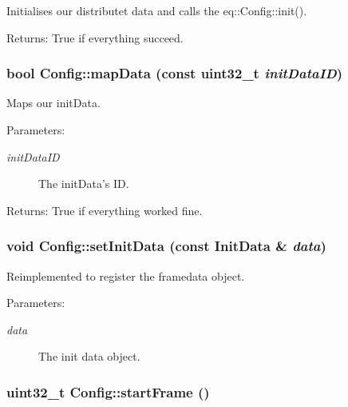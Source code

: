Initialises our distributet data and calls the eq::Config::init(). 

\begin{Desc}
\item[Returns:]True if everything succeed. \end{Desc}
\hypertarget{a00003_140db32dd04daba4cb95233e180b0327}{
\subsubsection[{mapData}]{\setlength{\rightskip}{0pt plus 5cm}bool Config::mapData (const uint32\_\-t {\em initDataID})}}
\label{a00003_140db32dd04daba4cb95233e180b0327}


Maps our initData. 

\begin{Desc}
\item[Parameters:]
\begin{description}
\item[{\em initDataID}]The initData's ID. \end{description}
\end{Desc}
\begin{Desc}
\item[Returns:]True if everything worked fine. \end{Desc}
\hypertarget{a00003_eac7f3b423d994667bac2007c5d78cc1}{
\subsubsection[{setInitData}]{\setlength{\rightskip}{0pt plus 5cm}void Config::setInitData (const {\bf InitData} \& {\em data})}}
\label{a00003_eac7f3b423d994667bac2007c5d78cc1}


Reimplemented to register the framedata object. 

\begin{Desc}
\item[Parameters:]
\begin{description}
\item[{\em data}]The init data object. \end{description}
\end{Desc}
\hypertarget{a00003_955b3c5ffe177012da10434fbc8da7e0}{
\subsubsection[{startFrame}]{\setlength{\rightskip}{0pt plus 5cm}uint32\_\-t Config::startFrame ()}}
\label{a00003_955b3c5ffe177012da10434fbc8da7e0}


